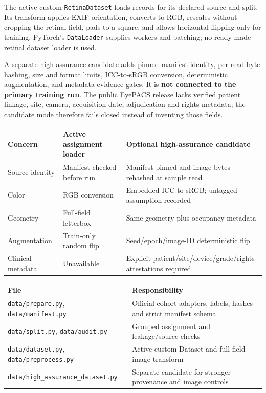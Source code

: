 \documentclass[10pt,a4paper]{article}
\newcommand{\smallhead}[1]{\vspace{5pt}{\color{teal}\bfseries #1}\par}
\newcommand{\code}[1]{\texttt{\small #1}}
\begin{document}
The active custom \code{RetinaDataset} loads records for its declared
source and split. Its transform applies EXIF orientation, converts to RGB,
rescales without cropping the retinal field, pads to a square, and allows
horizontal flipping only for training. PyTorch's \code{DataLoader} supplies
workers and batching; no ready-made retinal dataset loader is used.

A separate high-assurance candidate adds pinned manifest identity, per-read
byte hashing, size and format limits, ICC-to-sRGB conversion, deterministic
augmentation, and metadata evidence gates. It is \textbf{not connected to
the primary training run}. The public EyePACS release lacks verified
patient linkage, site, camera, acquisition date, adjudication and rights
metadata; the candidate mode therefore fails closed instead of inventing
those fields.

\small
\begin{tabularx}{\linewidth}{@{}p{.24\linewidth}Y Y@{}}
\toprule
Concern & Active assignment loader & Optional high-assurance candidate\\
\midrule
Source identity & Manifest checked before run & Manifest pinned and image
bytes rehashed at sample read\\
Color & RGB conversion & Embedded ICC to sRGB; untagged assumption recorded\\
Geometry & Full-field letterbox & Same geometry plus occupancy metadata\\
Augmentation & Train-only random flip & Seed/epoch/image-ID deterministic flip\\
Clinical metadata & Unavailable & Explicit patient/site/device/grade/rights
attestations required\\
\bottomrule
\end{tabularx}
\normalsize

\smallhead{Source map for data handling}
\small
\begin{tabularx}{\linewidth}{@{}p{.34\linewidth}Y@{}}
\toprule
File & Responsibility\\
\midrule
\code{data/prepare.py}, \code{data/manifest.py} &
Official cohort adapters, labels, hashes and strict manifest schema\\
\code{data/split.py}, \code{data/audit.py} &
Grouped assignment and leakage/source checks\\
\code{data/dataset.py}, \code{data/preprocess.py} &
Active custom Dataset and full-field image transform\\
\code{data/high\_assurance\_dataset.py} &
Separate candidate for stronger provenance and image controls\\
\bottomrule
\end{tabularx}
\normalsize
\end{document}
